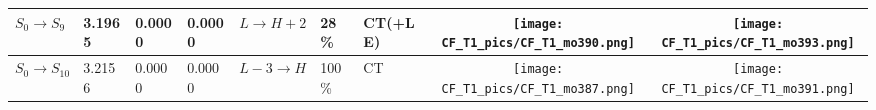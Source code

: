 \documentclass[9pt]{scrartcl}
\begin{document}
\begin{tabular}{l|lll|lllcc}
$S_0 \rightarrow S_{9} $       & 3.1965     & 0.0000     & 0.0000     & $L \rightarrow H+2$            & 28\%       & CT(+LE)    & \texttt{[image: CF\_T1\_pics/CF\_T1\_mo390.png]} & \texttt{[image: CF\_T1\_pics/CF\_T1\_mo393.png]}\\\hline
$S_0 \rightarrow S_{10} $      & 3.2156     & 0.0000     & 0.0000     & $L-3 \rightarrow H$            & 100\%      & CT         & \texttt{[image: CF\_T1\_pics/CF\_T1\_mo387.png]} & \texttt{[image: CF\_T1\_pics/CF\_T1\_mo391.png]}\\\hline
\end{tabular}
\end{document}
